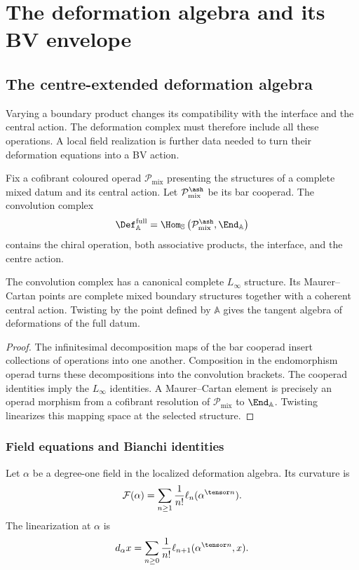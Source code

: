 \part{The deformation algebra and its BV envelope}


\chapter{The centre-extended deformation algebra}
Varying a boundary product changes its compatibility with the interface and the central action. The deformation complex must therefore include all these operations. A local field realization is further data needed to turn their deformation equations into a BV action.

Fix a cofibrant coloured operad $\mathcal P_{\mathrm{mix}}$ presenting the structures of a complete mixed datum and its central action.  Let $\mathcal P_{\mathrm{mix}}^{\ash}$ be its bar cooperad.  The convolution complex
\[
 \Def_{\mathbb A}^{\mathrm{full}}
 =\Hom_{\mathbb S}
 \left(\mathcal P_{\mathrm{mix}}^{\ash},\End_{\mathbb A}\right)
\]
contains the chiral operation, both associative products, the interface, and the centre action.

\begin{theorem}
The convolution complex has a canonical complete $L_\infty$ structure.  Its Maurer--Cartan points are complete mixed boundary structures together with a coherent central action.  Twisting by the point defined by $\mathbb A$ gives the tangent algebra of deformations of the full datum.
\end{theorem}
\begin{proof}
The infinitesimal decomposition maps of the bar cooperad insert collections of operations into one another.  Composition in the endomorphism operad turns these decompositions into the convolution brackets.  The cooperad identities imply the $L_\infty$ identities.  A Maurer--Cartan element is precisely an operad morphism from a cofibrant resolution of $\mathcal P_{\mathrm{mix}}$ to $\End_{\mathbb A}$.  Twisting linearizes this mapping space at the selected structure.
\end{proof}

\section{Field equations and Bianchi identities}
Let $\alpha$ be a degree-one field in the localized deformation algebra.  Its curvature is
\[
 \mathcal F(\alpha)
 =\sum_{n\ge1}\frac1{n!}\ell_n(\alpha^{\tensor n}).
\]
The linearization at $\alpha$ is
\[
 d_\alpha x
 =\sum_{n\ge0}\frac1{n!}
   \ell_{n+1}(\alpha^{\tensor n},x).
\]

